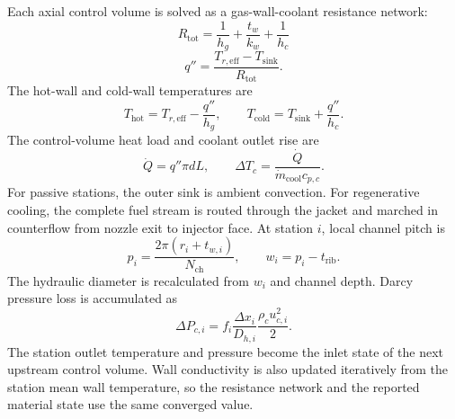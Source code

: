 \documentclass[11pt]{article}
\newcommand{\mdot}{\dot{m}}
\begin{document}
Each axial control volume is solved as a gas-wall-coolant resistance network:
\begin{equation}
R_{\mathrm{tot}}=\frac{1}{h_g}+\frac{t_w}{k_w}+\frac{1}{h_c}
\label{eq:thermal-resistance}
\end{equation}
\begin{equation}
q''=\frac{T_{r,\mathrm{eff}}-T_{\mathrm{sink}}}{R_{\mathrm{tot}}}.
\label{eq:heat-flux}
\end{equation}
The hot-wall and cold-wall temperatures are
\begin{equation}
T_{\mathrm{hot}}=T_{r,\mathrm{eff}}-\frac{q''}{h_g},
\qquad
T_{\mathrm{cold}}=T_{\mathrm{sink}}+\frac{q''}{h_c}.
\label{eq:wall-temperatures}
\end{equation}
The control-volume heat load and coolant outlet rise are
\begin{equation}
\dot{Q}=q''\pi dL,
\qquad
\Delta T_c=\frac{\dot{Q}}{\mdot_{\mathrm{cool}}c_{p,c}}.
\label{eq:section-heat-load}
\end{equation}
For passive stations, the outer sink is ambient convection. For regenerative cooling, the complete fuel stream is routed through the jacket and marched in counterflow from nozzle exit to injector face. At station $i$, local channel pitch is
\begin{equation}
p_i=\frac{2\pi(r_i+t_{w,i})}{N_{\mathrm{ch}}},
\qquad
w_i=p_i-t_{\mathrm{rib}}.
\label{eq:local-channel-pitch}
\end{equation}
The hydraulic diameter is recalculated from $w_i$ and channel depth. Darcy pressure loss is accumulated as
\begin{equation}
\Delta P_{c,i}=f_i\frac{\Delta x_i}{D_{h,i}}\frac{\rho_c u_{c,i}^2}{2}.
\label{eq:coolant-pressure-march}
\end{equation}
The station outlet temperature and pressure become the inlet state of the next upstream control volume. Wall conductivity is also updated iteratively from the station mean wall temperature, so the resistance network and the reported material state use the same converged value.
\end{document}

